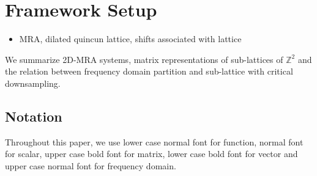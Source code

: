 \section{Framework Setup}\label{sec: setup}
\begin{itemize}

\item MRA, dilated quincun lattice, shifts associated with lattice
\end{itemize}
We summarize 2D-MRA systems, matrix representations of sub-lattices of $\mathbb{Z}^2$ and the relation between frequency domain partition and sub-lattice with critical downsampling.

\subsection{Notation}
Throughout this paper, we use lower case normal font for function, normal font for scalar, upper case bold font for matrix, lower case bold font for vector and upper case normal font for frequency domain.

